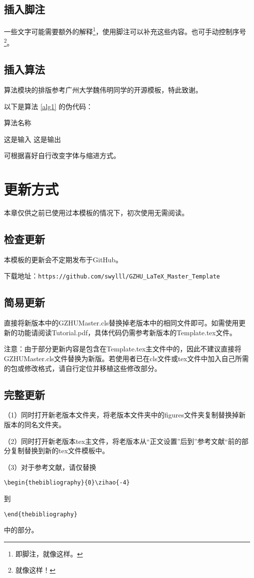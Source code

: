 \documentclass{GZHUMaster}
\begin{document}
\section{插入脚注}
一些文字可能需要额外的解释\footnote{即脚注，就像这样。}，使用脚注可以补充这些内容。也可手动控制序号\footnote[16]{就像这样！}。
\section{插入算法}
算法模块的排版参考广州大学魏伟明同学的开源模板，特此致谢。\par
以下是算法 \ref{alg1} 的伪代码：\par
\begin{algorithm}[h]
  \caption{算法名称}
  \begin{algorithmic}[1] %
      \Require 这是输入
      \Ensure 这是输出
           
      \EndFor
      \EndIf
      \EndWhile
  \end{algorithmic}
  \label{alg1}
\end{algorithm}
可根据喜好自行改变字体与缩进方式。

\chapter{更新方式}
本章仅供之前已使用过本模板的情况下，初次使用无需阅读。
\section{检查更新}
本模板的更新会不定期发布于GitHub。\par
下载地址：\verb|https://github.com/swylll/GZHU_LaTeX_Master_Template|
\section{简易更新}
直接将新版本中的GZHUMaster.cls替换掉老版本中的相同文件即可。如需使用更新的功能请阅读Tutorial.pdf，具体代码仍需参考新版本的Template.tex文件。\par
注意：由于部分更新内容是包含在Template.tex主文件中的，因此不建议直接将GZHUMaster.cls文件替换为新版。若使用者已在cls文件或tex文件中加入自己所需的包或修改格式，请自行定位并移植这些修改部分。
\section{完整更新}
（1）同时打开新老版本文件夹，将老版本文件夹中的figures文件夹复制替换掉新版本的同名文件夹。\par
（2）同时打开新老版本tex主文件，将老版本从“正文设置”后到”参考文献“前的部分复制替换到新的tex文件模板中。\par
（3）对于参考文献，请仅替换\par
\verb|\begin{thebibliography}{0}\zihao{-4}|\par
到\par
\verb|\end{thebibliography}|\par
中的部分。
\end{document}
